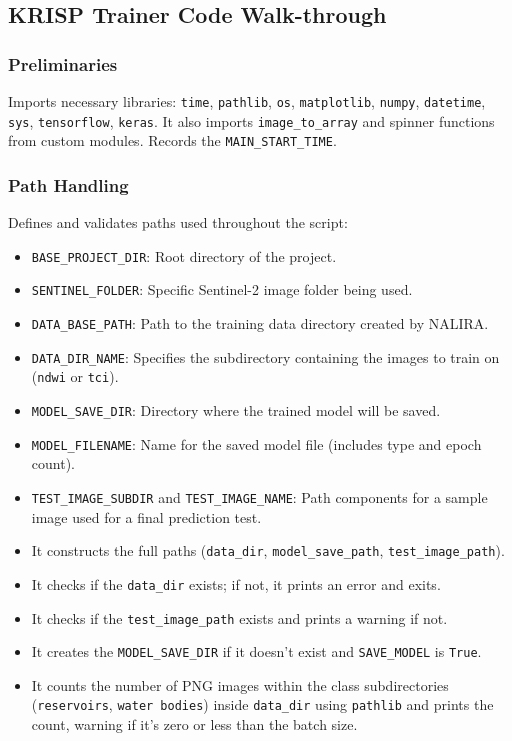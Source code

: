 \subsection{KRISP Trainer Code Walk-through}

\subsubsection{Preliminaries}
Imports necessary libraries: \verb|time|, \verb|pathlib|, \verb|os|, \verb|matplotlib|, \verb|numpy|, \verb|datetime|, \verb|sys|, \verb|tensorflow|, \verb|keras|. It also imports \verb|image_to_array| and spinner functions from custom modules. Records the \verb|MAIN_START_TIME|.

\subsubsection{Path Handling}
Defines and validates paths used throughout the script:
\begin{itemize}
    \item \verb|BASE_PROJECT_DIR|: Root directory of the project.
    \item \verb|SENTINEL_FOLDER|: Specific Sentinel-2 image folder being used.
    \item \verb|DATA_BASE_PATH|: Path to the training data directory created by NALIRA.
    \item \verb|DATA_DIR_NAME|: Specifies the subdirectory containing the images to train on (\texttt{ndwi} or \texttt{tci}).
    \item \verb|MODEL_SAVE_DIR|: Directory where the trained model will be saved.
    \item \verb|MODEL_FILENAME|: Name for the saved model file (includes type and epoch count).
    \item \verb|TEST_IMAGE_SUBDIR| and \verb|TEST_IMAGE_NAME|: Path components for a sample image used for a final prediction test.
    \item It constructs the full paths (\verb|data_dir|, \verb|model_save_path|, \verb|test_image_path|).
    \item It checks if the \verb|data_dir| exists; if not, it prints an error and exits.
    \item It checks if the \verb|test_image_path| exists and prints a warning if not.
    \item It creates the \verb|MODEL_SAVE_DIR| if it doesn't exist and \verb|SAVE_MODEL| is \verb|True|.
    \item It counts the number of PNG images within the class subdirectories (\verb|reservoirs|, \verb|water bodies|) inside \verb|data_dir| using \verb|pathlib| and prints the count, warning if it's zero or less than the batch size.
\end{itemize}

